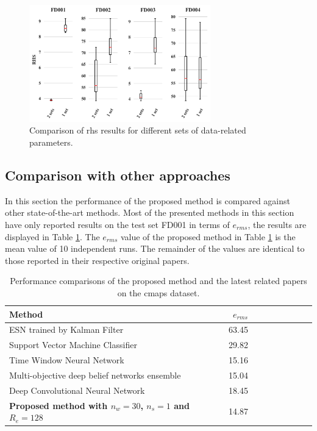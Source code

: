 \begin{figure}[!htb]
\centering
\includegraphics[width=0.7\textwidth]{../img/rhs_comparisson.png}
\caption{Comparison of \gls{rhs} results for different sets of data-related parameters.}
\label{fig:scores_rhs}
\end{figure}

\subsection{Comparison with other approaches}

In this section the performance of the proposed method is compared against other state-of-the-art methods. Most of the presented methods in this section have only reported results on the test set FD001 in terms of $e_{rms}$, the results are displayed in Table \ref{table:results_comparison}. The $e_{rms}$ value of the proposed method in Table \ref{table:results_comparison} is the mean value of 10 independent runs. The remainder of the values are identical to those reported in their respective original papers.

\begin{table}[!htb]
\centering
\begin{tabular}{l | r r r r | r r r r}
	\hline	
	Method & $e_{rms}$ \\
  	\hline
  	ESN trained by Kalman Filter \citep{Peng2012} & 63.45\\
  	Support Vector Machine Classifier \citep{Louen2013} & 29.82\\
  	Time Window Neural Network \citep{Lim2016} & 15.16\\
  	Multi-objective deep belief networks ensemble \citep{Zhang2016} & 15.04\\
  	Deep Convolutional Neural Network \citep{Babu2016} & 18.45\\
  	\textbf{Proposed method with $n_w = 30$, $n_s=1$ and $R_e = 128$} & 14.87\\
  	\hline
\end{tabular}
\caption{Performance comparisons of the proposed method and the latest related papers on the \gls{cmaps} dataset.}
\label{table:results_comparison}
\end{table}

